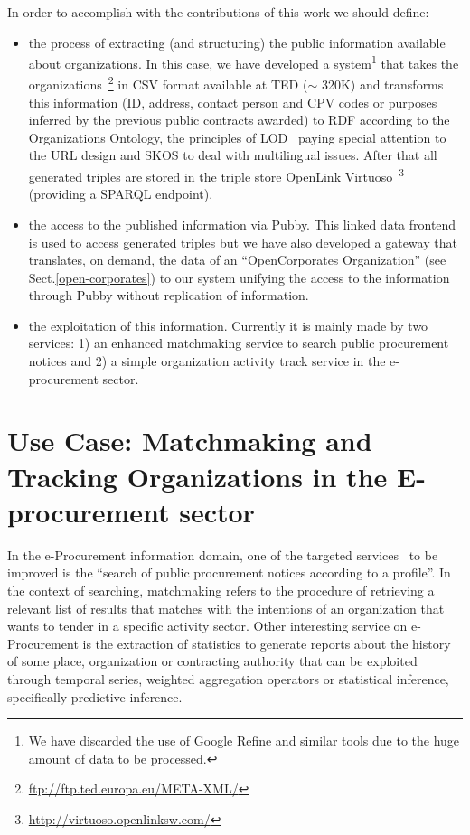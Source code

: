 \documentclass{llncs}
\begin{document}
In order to accomplish with the contributions of this work we should define:
\begin{itemize}
 \item the process of extracting (and structuring) the public information available about organizations. In this case, we have developed
a system\footnote{We have discarded the use of Google Refine and similar tools due to the huge amount of data to be processed.} 
that takes the organizations~\footnote{\url{ftp://ftp.ted.europa.eu/META-XML/}} in CSV format available at TED 
 ($\sim$ 320K) and transforms this information (ID, address, contact person and CPV codes or purposes inferred by the previous public 
contracts awarded) to RDF according to the Organizations Ontology, the principles of LOD~\cite{heath11linked} paying special 
attention to the URL design and SKOS to deal with multilingual issues. After that all generated triples are stored 
in the triple store OpenLink Virtuoso~\footnote{\url{http://virtuoso.openlinksw.com/}} (providing a SPARQL endpoint). 
\item the access to the published information via Pubby. This linked data frontend is used to access generated triples but we have also developed a gateway that translates, on demand, the data of an ``OpenCorporates
Organization'' (see Sect.\ref{open-corporates}) to our system unifying the access to the information through Pubby without replication of information.
\item the exploitation of this information. Currently it is mainly made by two services: 1) an enhanced matchmaking service to search public procurement notices and
2) a simple organization activity track service in the e-procurement sector.
\end{itemize}

\section{Use Case: Matchmaking and Tracking Organizations in the E-procurement sector}
In the e-Procurement information domain, one of the targeted services~\cite{metteg2011} to be improved is the 
``search of public procurement notices according to a profile''. In the context of searching, 
matchmaking refers to the procedure of retrieving a relevant list of results that matches with the 
intentions of an organization that wants to tender in a specific activity sector. Other interesting service 
on e-Procurement is the extraction of statistics to generate reports about the history of 
some place, organization or contracting authority that can be exploited through temporal series, 
weighted aggregation operators or statistical inference, specifically predictive inference. 
\end{document}
